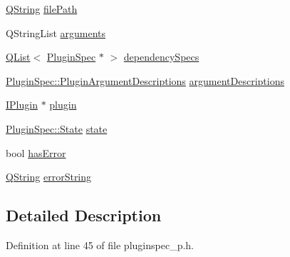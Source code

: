 \begin{DoxyCompactItemize}
\item 
\hyperlink{group___u_a_v_objects_plugin_gab9d252f49c333c94a72f97ce3105a32d}{Q\-String} \hyperlink{class_extension_system_1_1_internal_1_1_plugin_spec_private_a048e4d091eccd93affd5c38b841ad2ed}{file\-Path}
\item 
Q\-String\-List \hyperlink{class_extension_system_1_1_internal_1_1_plugin_spec_private_ae1681eb5cafc61fa0736e1a75b557c20}{arguments}
\item 
\hyperlink{class_q_list}{Q\-List}$<$ \hyperlink{class_extension_system_1_1_plugin_spec}{Plugin\-Spec} $\ast$ $>$ \hyperlink{class_extension_system_1_1_internal_1_1_plugin_spec_private_abd32e8602856b2fe48fed8140846be54}{dependency\-Specs}
\item 
\hyperlink{class_extension_system_1_1_plugin_spec_acf81cc5fcc20b047203f9da886cbbdee}{Plugin\-Spec\-::\-Plugin\-Argument\-Descriptions} \hyperlink{class_extension_system_1_1_internal_1_1_plugin_spec_private_a32dd76917c01771fb0ad25ff50193fbc}{argument\-Descriptions}
\item 
\hyperlink{class_extension_system_1_1_i_plugin}{I\-Plugin} $\ast$ \hyperlink{class_extension_system_1_1_internal_1_1_plugin_spec_private_a45c4fa79923c8d0624258b8f733125f1}{plugin}
\item 
\hyperlink{class_extension_system_1_1_plugin_spec_a3d40e1bd1f17eb32b314bcd282b3e3b9}{Plugin\-Spec\-::\-State} \hyperlink{class_extension_system_1_1_internal_1_1_plugin_spec_private_a1806625ef956622e6727d0b0d50274aa}{state}
\item 
bool \hyperlink{class_extension_system_1_1_internal_1_1_plugin_spec_private_aaee87e26d32c27c408a5059bd821b217}{has\-Error}
\item 
\hyperlink{group___u_a_v_objects_plugin_gab9d252f49c333c94a72f97ce3105a32d}{Q\-String} \hyperlink{class_extension_system_1_1_internal_1_1_plugin_spec_private_a1fdbeffffeb8b7a7dbb2d30417674d83}{error\-String}
\end{DoxyCompactItemize}


\subsection{Detailed Description}


Definition at line 45 of file pluginspec\-\_\-p.\-h.



